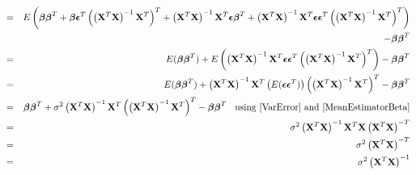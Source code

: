 \documentclass[11pt]{article}
\theoremstyle{remark}
\begin{document}
\begin{eqnarray}
&=& E\left(\boldsymbol{\beta}\boldsymbol{\beta}^T  + \boldsymbol{\beta} \boldsymbol{\epsilon}^T\left(\left(\bold{X}^T\bold{X}\right)^{-1}\bold{X}^T\right)^T + \left(\bold{X}^T\bold{X}\right)^{-1}\bold{X}^T\boldsymbol{\epsilon}\boldsymbol{\beta}^T + \left(\bold{X}^T\bold{X}\right)^{-1}\bold{X}^T\boldsymbol{\epsilon}\boldsymbol{\epsilon}^T\left(\left(\bold{X}^T\bold{X}\right)^{-1}\bold{X}^T\right)^T\right) \nonumber\\
&& - \boldsymbol{\beta}\boldsymbol{\beta}^T\nonumber\\
&=& E(\boldsymbol{\beta}\boldsymbol{\beta}^T) + E\left(\left(\bold{X}^T\bold{X}\right)^{-1}\bold{X}^T\boldsymbol{\epsilon}\boldsymbol{\epsilon}^T\left(\left(\bold{X}^T\bold{X}\right)^{-1}\bold{X}^T\right)^T\right) - \boldsymbol{\beta}\boldsymbol{\beta}^T\nonumber\\
&=& E(\boldsymbol{\beta}\boldsymbol{\beta}^T) + \left(\bold{X}^T\bold{X}\right)^{-1}\bold{X}^T\left(E(\boldsymbol{\epsilon}\boldsymbol{\epsilon}^T)\right)\left(\left(\bold{X}^T\bold{X}\right)^{-1}\bold{X}^T\right)^T - \boldsymbol{\beta}\boldsymbol{\beta}^T\nonumber\\
&=& \boldsymbol{\beta}\boldsymbol{\beta}^T + \sigma^2 \left(\bold{X}^T\bold{X}\right)^{-1}\bold{X}^T\left(\left(\bold{X}^T\bold{X}\right)^{-1}\bold{X}^T\right)^T - \boldsymbol{\beta}\boldsymbol{\beta}^T\:\:\:\:\text{using \eqref{VarError} and \eqref{MeanEstimatorBeta}}\nonumber\\
&=& \sigma^2 \left(\bold{X}^T\bold{X}\right)^{-1}\bold{X}^T\bold{X}\left(\bold{X}^T\bold{X}\right)^{-T}\nonumber\\
&=& \sigma^2 \left(\bold{X}^T\bold{X}\right)^{-T}\nonumber\\
&=& \sigma^2 \left(\bold{X}^T\bold{X}\right)^{-1}\label{VarEstimator}
\end{eqnarray}



\end{document}
